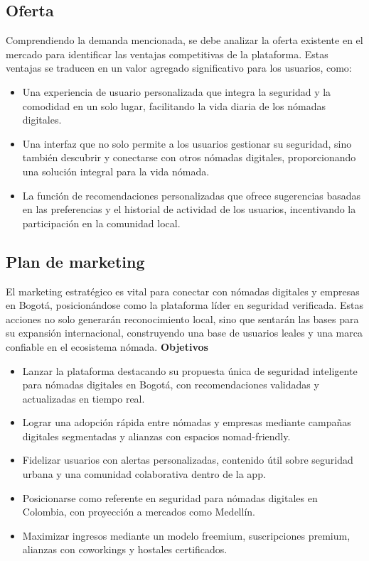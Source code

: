 \subsection*{Oferta}
Comprendiendo la demanda mencionada, se debe analizar la oferta existente en el mercado para identificar las ventajas competitivas de la plataforma. Estas ventajas se traducen en un valor agregado significativo para los usuarios, como:
\begin{itemize}
    \item Una experiencia de usuario personalizada que integra la seguridad y la comodidad en un solo lugar, facilitando la vida diaria de los nómadas digitales.
    
    \item Una interfaz que no solo permite a los usuarios gestionar su seguridad, sino también descubrir y conectarse con otros nómadas digitales, proporcionando una solución integral para la vida nómada.
    
    \item La función de recomendaciones personalizadas que ofrece sugerencias basadas en las preferencias y el historial de actividad de los usuarios, incentivando la participación en la comunidad local.
\end{itemize}

\subsection*{Plan de marketing}
El marketing estratégico es vital para conectar con nómadas digitales y empresas en Bogotá, posicionándose como la plataforma líder en seguridad verificada. Estas acciones no solo generarán reconocimiento local, sino que sentarán las bases para su expansión internacional, construyendo una base de usuarios leales y una marca confiable en el ecosistema nómada.
\textbf{Objetivos}
\begin{itemize}
    \item Lanzar la plataforma destacando su propuesta única de seguridad inteligente para nómadas digitales en Bogotá, con recomendaciones validadas y actualizadas en tiempo real.
    \item Lograr una adopción rápida entre nómadas y empresas mediante campañas digitales segmentadas y alianzas con espacios nomad-friendly.
    \item Fidelizar usuarios con alertas personalizadas, contenido útil sobre seguridad urbana y una comunidad colaborativa dentro de la app.
    \item Posicionarse como referente en seguridad para nómadas digitales en Colombia, con proyección a mercados como Medellín.
    \item Maximizar ingresos mediante un modelo freemium, suscripciones premium, alianzas con coworkings y hostales certificados.

\end{itemize}

